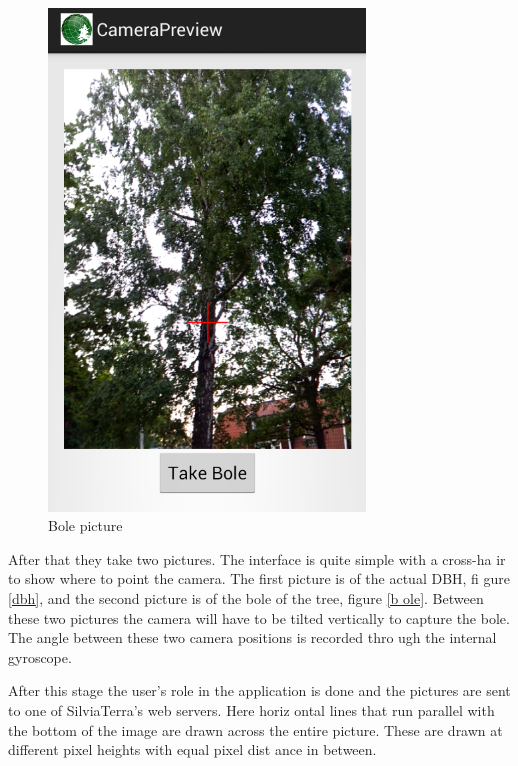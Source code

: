\begin{figure}[!htb]
	  	\includegraphics[width=0.75\textwidth]{bole.png}
	  	\caption{Bole picture}
	  	\label{bole}
	\endminipage\hfill
\end{figure}

After that they take two pictures. The interface is quite simple with a cross-ha
ir to show where to point the camera. The first picture is of the actual DBH, fi
gure \ref{dbh}, and the second picture is of the bole of the tree, figure \ref{b
ole}. Between these two pictures the camera will have to be tilted vertically to
 capture the bole. The angle between these two camera positions is recorded thro
ugh the internal gyroscope. %

After this stage the user's role in the application 
is done and the pictures are sent to one of SilviaTerra's web servers. Here horiz
ontal lines that run parallel with the bottom of the image are drawn across the 
entire picture. These are drawn at different pixel heights with equal pixel dist
ance in between. 

